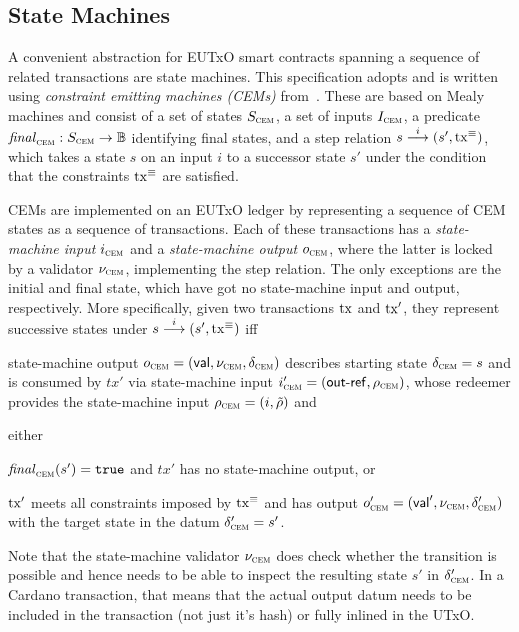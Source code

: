 \subsection{State Machines}\label{sec:cem}

A convenient abstraction for EUTxO smart contracts spanning a sequence of
related transactions are state machines. This specification adopts and is
written using \emph{constraint emitting machines (CEMs)} from~\cite{eutxo}.
These are based on Mealy machines and consist of a set of states $S_{\textsc{cem}}$, a set
of inputs $I_{\textsc{cem}}$, a predicate \(\mathit{final}_{\textsc{cem}} : S_{\textsc{cem}}\to\mathbb{B}\) identifying final
states, and a step relation \({s}\overset{i}\longrightarrow(s', \mathrm{tx}^\equiv)\), which takes a
state $s$ on an input $i$ to a successor state $s'$ under the condition that the
constraints $\mathrm{tx}^\equiv$ are satisfied.

CEMs are implemented on an EUTxO ledger by representing a sequence of CEM states
as a sequence of transactions. Each of these transactions has a
\emph{state-machine input} $i_{\textsc{cem}}$ and a \emph{state-machine output} $o_{\textsc{cem}}$,
where the latter is locked by a validator $\nu_{\textsc{cem}}$, implementing the step
relation. The only exceptions are the initial and final state, which have got no
state-machine input and output, respectively. More specifically, given two
transactions $\mathrm{tx}$ and $\mathrm{tx}'$, they represent successive states under
\({s}\overset{i}\longrightarrow(s', \mathrm{tx}^\equiv)\) iff

\begin{mitemize}
	\item state-machine output $o_{\textsc{cem}} = (\mathsf{val}, \nu_{\textsc{cem}}, \delta_{\textsc{cem}})$
	describes starting state $\delta_{\textsc{cem}} = s$ and is consumed by $tx'$ via
	state-machine input $i_{\textsc{cem}}' = (\mathsf{out\textsf{-}{}ref}, \rho_{\textsc{cem}})$, whose redeemer
	provides the state-machine input $\rho_{\textsc{cem}} = (i, \tilde{\rho})$ and
	\item either
	\begin{mitemize}
		\item $\mathit{final}_{\textsc{cem}}(s') = \mathtt{true}$ and $tx'$ has no state-machine output, or
		\item $\mathrm{tx}'$ meets all constraints imposed by $\mathrm{tx}^\equiv$ and has output
		$o_{\textsc{cem}}' = (\mathsf{val}', \nu_{\textsc{cem}}, \delta_{\textsc{cem}}')$ with the target state in
		the datum $\delta_{\textsc{cem}}' = s'$.
	\end{mitemize}
\end{mitemize}

Note that the state-machine validator $\nu_{\textsc{cem}}$ does check whether the
transition is possible and hence needs to be able to inspect the resulting state
$s'$ in $\delta_{\textsc{cem}}'$. In a Cardano transaction, that means that the actual output
datum needs to be included in the transaction (not just it's hash) or fully inlined
in the UTxO.

